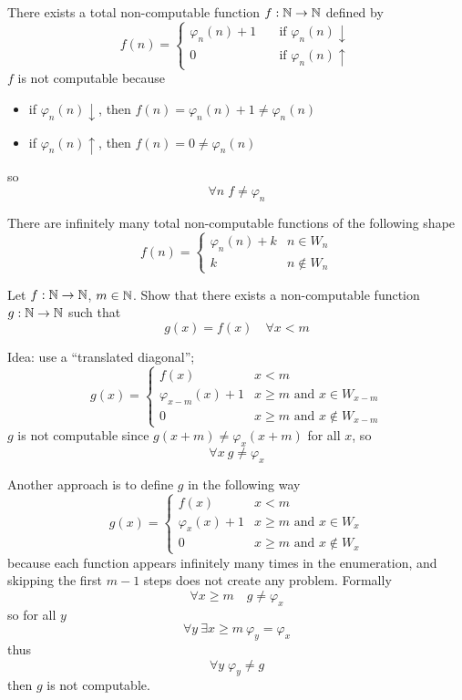 \begin{observation}
  There exists a total non-computable function $f : \mathbb{N} \to \mathbb{N}$ defined by
  \[
    f(n) = \begin{cases}

      \varphi_n(n) + 1 & \quad \mbox{if } \varphi_n(n) \downarrow  \\

       0 & \quad \mbox{if } \varphi_n(n)\uparrow 
    \end{cases}
  \]
  $f$ is not computable because
  \begin{itemize}
    \item if $\varphi_n(n) \downarrow$, then $f(n) = \varphi_n(n) + 1 \neq \varphi_n(n) $
    \item if $\varphi_n(n)\uparrow$, then $f(n) = 0 \neq \varphi_n(n)$
  \end{itemize}
  so \[\forall n \; f \neq \varphi_n\]
\end{observation}


\begin{observation}
  There are infinitely many total non-computable
functions of the following shape
\[
  f(n)  = \begin{cases}
    \varphi_n(n) + k & n \in W_n \\
    k & n \notin W_n
  \end{cases}
\]

\end{observation}

\begin{exercise}
  Let $f: \mathbb{N} \rightarrow \mathbb{N}$, $m \in \mathbb{N}$.
  Show that there exists a non-computable function $g : \mathbb{N} \rightarrow \mathbb{N}$ 
  such that \[g(x) = f(x) \quad \forall x < m\]

  Idea: use a ``translated diagonal'';
  \[
    g(x) = \begin{cases}
      f(x) & x < m \\
      \varphi_{x - m}(x) + 1 & x \geq m \mbox{ and } x \in W_{x-m} \\
      0 & x \geq m \mbox{ and } x \notin W_{x-m}
    \end{cases}
  \]
  $g$ is not computable since
  $g(x + m) \neq \varphi_x(x+m)$ for all $x$, so
  \[\forall x \ g\neq \varphi_x\]

  Another approach is to define $g$ in the following way
  \[
    g(x) = \begin{cases}
      f(x) & x < m \\
      \varphi_x(x) + 1 & x \geq m \mbox{ and } x \in W_{x} \\
      0 & x \geq m \mbox{ and } x \notin W_{x}
    \end{cases}
  \]
  because each function appears infinitely many times in the enumeration,
  and skipping the first $m-1$ steps does not create any
  problem. Formally
  \[
    \forall x \geq m \quad g \neq \varphi_x
    \]
    so for all $y$
  \[
    \forall y\ \exists x \geq m \ \varphi_y = \varphi_x
  \]
    thus \[
      \forall y \; \varphi_y \neq g
      \]
  then $g$ is not computable.
\end{exercise}

